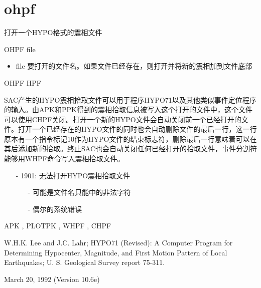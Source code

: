 \section{ohpf}
\label{cmd:ohpf}

打开一个HYPO格式的震相文件

OHPF {file}

\begin{itemize}
\item file  要打开的文件名。如果文件已经存在，则打开并将新的震相加到文件底部
\end{itemize}

OHPF HPF

SAC产生的HYPO震相拾取文件可以用于程序HYPO71以及其他类似事件定位程序的输入。由APK和PPK得到的震相拾取信息被写入这个打开的文件中，这个文件可以使用CHPF关闭。打开一个新的HYPO文件会自动关闭前一个已经打开的文件。打开一个已经存在的HYPO文件的同时也会自动删除文件的最后一行，这一行原本有一个指令标记10作为HYPO文件的结束标志符，删除最后一行意味着可以在其后添加新的拾取。终止SAC也会自动关闭任何已经打开的拾取文件，事件分割符能够用WHPF命令写入震相拾取文件。

\begin{itemize}
\item[-]1901: 无法打开HYPO震相拾取文件
	\begin{itemize}
	\item[-]可能是文件名只能中的非法字符
	\item[-]偶尔的系统错误
	\end{itemize}
\end{itemize}

APK , PLOTPK , WHPF , CHPF

W.H.K. Lee and J.C. Lahr; HYPO71 (Revised): A Computer Program for Determining Hypocenter, Magnitude, and First Motion Pattern of Local Earthquakes; U. S. Geological Survey report 75-311.

March 20, 1992 (Version 10.6e)
